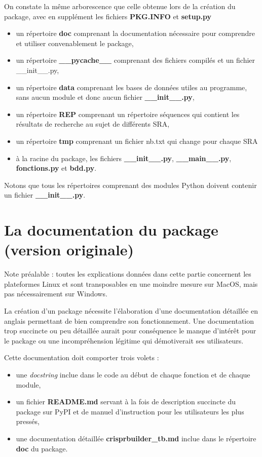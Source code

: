 \documentclass[twoside,a4paper,11pt,frenchb,openany]{report}
\begin{document}
On constate la même arborescence que celle obtenue lors de la création du package, avec en supplément les fichiers \textbf{PKG.INFO} et \textbf{setup.py}



\begin{itemize}
\item un répertoire \textbf{doc} comprenant la documentation nécessaire pour comprendre et utiliser convenablement le package,
\item un répertoire \textbf{\_\_pycache\_\_} comprenant des fichiers compilés et un fichier \_\_init\_\_.py,
\item un répertoire \textbf{data} comprenant les bases de données utiles au programme, sans aucun module et donc aucun fichier \textbf{\_\_init\_\_.py},
\item un répertoire \textbf{REP} comprenant un répertoire séquences qui contient les résultats de recherche au sujet de différents SRA,
\item un répertoire \textbf{tmp} comprenant un fichier nb.txt qui change pour chaque SRA
\item à la racine du package, les fichiers \textbf{\_\_init\_\_.py}, \textbf{\_\_main\_\_.py}, \textbf{fonctions.py} et \textbf{bdd.py}.
\end{itemize}

Notons que tous les répertoires comprenant des modules Python doivent contenir un fichier
\textbf{ \_\_init\_\_.py}.



\chapter{La documentation du package \\(version originale)}

Note préalable : toutes les explications données dans cette partie concernent les plateformes Linux et sont transposables en une moindre mesure sur MacOS, mais pas nécessairement sur Windows.

La création d'un package nécessite l'élaboration d'une documentation détaillée en anglais permettant de bien comprendre son fonctionnement. Une documentation trop succincte ou peu détaillée aurait pour conséquence le manque d'intérêt pour le package ou une incompréhension légitime qui démotiverait ses utilisateurs.

Cette documentation doit comporter trois volets :
\begin{itemize}
\item une \textit{docstring} inclue dans le code au début de chaque fonction et de chaque module,
\item un fichier \textbf{README.md} servant à la fois de description succincte du package sur PyPI et de manuel d'instruction pour les utilisateurs les plus pressés,
\item une documentation détaillée \textbf{crisprbuilder\_tb.md} inclue dans le répertoire \textbf{doc} du package.
\end{itemize}   
\end{document}

